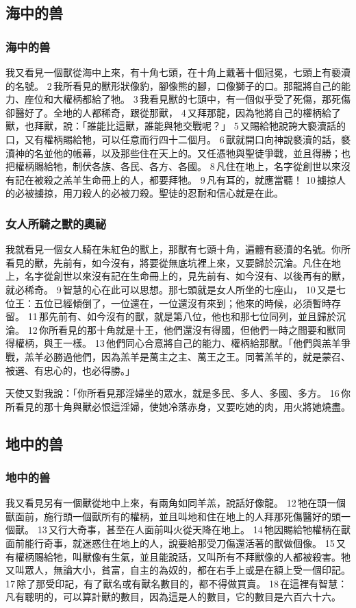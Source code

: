 \subsection{海中的兽}
\subsubsection{海中的兽}

我又看見一個獸從海中上來，有十角七頭，在十角上戴著十個冠冕，七頭上有褻瀆的名號。 2 我所看見的獸形狀像豹，腳像熊的腳，口像獅子的口。那龍將自己的能力、座位和大權柄都給了牠。 3 我看見獸的七頭中，有一個似乎受了死傷，那死傷卻醫好了。全地的人都稀奇，跟從那獸， 4 又拜那龍，因為牠將自己的權柄給了獸，也拜獸，說：「誰能比這獸，誰能與牠交戰呢？」 5 又賜給牠說誇大褻瀆話的口，又有權柄賜給牠，可以任意而行四十二個月。 6 獸就開口向神說褻瀆的話，褻瀆神的名並他的帳幕，以及那些住在天上的。又任憑牠與聖徒爭戰，並且得勝；也把權柄賜給牠，制伏各族、各民、各方、各國。 8 凡住在地上，名字從創世以來沒有記在被殺之羔羊生命冊上的人，都要拜牠。 9 凡有耳的，就應當聽！ 10 擄掠人的必被擄掠，用刀殺人的必被刀殺。聖徒的忍耐和信心就是在此。

\subsubsection{女人所騎之獸的奧祕}
我就看見一個女人騎在朱紅色的獸上，那獸有七頭十角，遍體有褻瀆的名號。你所看見的獸，先前有，如今沒有，將要從無底坑裡上來，又要歸於沉淪。凡住在地上，名字從創世以來沒有記在生命冊上的，見先前有、如今沒有、以後再有的獸，就必稀奇。 9 智慧的心在此可以思想。那七頭就是女人所坐的七座山， 10 又是七位王：五位已經傾倒了，一位還在，一位還沒有來到；他來的時候，必須暫時存留。 11 那先前有、如今沒有的獸，就是第八位，他也和那七位同列，並且歸於沉淪。 12 你所看見的那十角就是十王，他們還沒有得國，但他們一時之間要和獸同得權柄，與王一樣。 13 他們同心合意將自己的能力、權柄給那獸。「他們與羔羊爭戰，羔羊必勝過他們，因為羔羊是萬主之主、萬王之王。同著羔羊的，就是蒙召、被選、有忠心的，也必得勝。」

天使又對我說：「你所看見那淫婦坐的眾水，就是多民、多人、多國、多方。 16 你所看見的那十角與獸必恨這淫婦，使她冷落赤身，又要吃她的肉，用火將她燒盡。



\subsection{地中的兽 }
\subsubsection{地中的兽}
我又看見另有一個獸從地中上來，有兩角如同羊羔，說話好像龍。 12 牠在頭一個獸面前，施行頭一個獸所有的權柄，並且叫地和住在地上的人拜那死傷醫好的頭一個獸。 13 又行大奇事，甚至在人面前叫火從天降在地上。 14 牠因賜給牠權柄在獸面前能行奇事，就迷惑住在地上的人，說要給那受刀傷還活著的獸做個像。 15 又有權柄賜給牠，叫獸像有生氣，並且能說話，又叫所有不拜獸像的人都被殺害。牠又叫眾人，無論大小，貧富，自主的為奴的，都在右手上或是在額上受一個印記。 17 除了那受印記，有了獸名或有獸名數目的，都不得做買賣。 18 在這裡有智慧：凡有聰明的，可以算計獸的數目，因為這是人的數目，它的數目是六百六十六。
